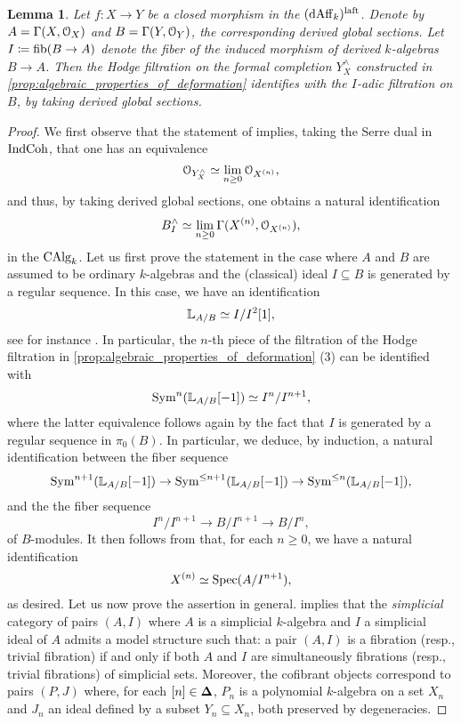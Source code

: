\documentclass[10pt,a4paper,reqno]{amsart} %
\theoremstyle{plain}
\newtheorem{lem}[thm]{Lemma}
\theoremstyle{definition}
\theoremstyle{remark}
\numberwithin{equation}{section}
\begin{document}
\begin{lem} \label{lem:identification_of_Hodge_and_adic_filtrations}
    Let $f \colon X \to Y$ be a closed morphism in the \infcat $(\mathrm{dAff}_k)^{\mathrm{laft}}$. Denote by $A = \Gamma(X, \mathcal O_X)$ and $B = \Gamma(Y, \mathcal O_Y)$, the corresponding derived
    global sections. Let $I \coloneqq \mathrm{fib}(B \to A)$ denote the fiber of the induced morphism of derived $k$-algebras $B \to A$. Then the Hodge filtration on the formal completion $Y^\wedge_X$ constructed in
    \cref{prop:algebraic_properties_of_deformation} identifies with the $I$-adic filtration on $B$, by taking derived global sections.
\end{lem}

\begin{proof}
    We first observe that the statement of \cite[Corollary 9.5.2.5]{Gaitsgory_Study_II} implies, taking the Serre dual in $\mathrm{Ind}\mathrm{Coh}$, that one has an equivalence
        \[
            \mathcal O_{Y^\wedge_X} \simeq \lim_{n \ge 0} \mathcal O_{X^{(n)}},  
        \]
    and thus, by taking derived global sections, one obtains a natural identification   
        \[
            B^\wedge_I \simeq \lim_{n \ge 0} \Gamma(X^{(n)}, \mathcal O_{X^{(n)}}),  
        \]
    in the \infcat $\mathrm{CAlg}_k$. Let us first prove the statement in the case where $A$ and $B$ are assumed to be ordinary $k$-algebras and the (classical) ideal $I \subseteq B$ is generated by a regular sequence.
    In this case, we have an identification
        \[
            \mathbb L_{A/ B} \simeq I/ I^2 [1],
        \]
    see for instance \cite[\href{https://stacks.math.columbia.edu/tag/08SJ}{Tag 08SJ}]{stacks-project}.
    In particular, the $n$-th piece of the filtration of the Hodge filtration in \cref{prop:algebraic_properties_of_deformation} (3) can be identified with
        \[
            \operatorname{Sym}^n(\mathbb L_{A/ B}[-1]) \simeq I^n/ I^{n+1}, 
        \]
    where the latter equivalence follows again by the fact that $I$ is generated by a regular sequence in $\pi_0(B)$. In particular, we deduce, by induction, a natural identification between
    the fiber sequence
        \[
            \operatorname{Sym}^{n+1}(\mathbb L_{A/ B}[-1]) \to \operatorname{Sym}^{\le n+1}(\mathbb L_{A/ B}[-1]) \to \operatorname{Sym}^{\le n}(\mathbb L_{A/ B}[-1]),
        \]
    and the the fiber sequence
        \[  
            I^n/ I^{n+1} \to B/ I^{n+1} \to B/ I^n,
        \]
    of $B$-modules. It then follows from \cite[Theorem 9.5.1.3]{Gaitsgory_Study_II} that, for each $n \ge 0$, we have a natural identification
        \[
            X^{(n)} \simeq \operatorname{Spec} (A/ I^{n+1}) ,
        \]
     as desired. Let us now prove the assertion in general. \cite[\S II. 4, Theorem 4]{Quillen_Homotopical_1967} implies that the \emph{simplicial} category of pairs
     $(A, I)$ where $A$ is a simplicial $k$-algebra and $I$ a simplicial ideal of $A$ admits a model structure such that:
     a pair $(A, I)$ is a fibration (resp., trivial fibration) if and only if both $A$ and $I$ are simultaneously fibrations (resp., trivial fibrations)
     of simplicial sets. Moreover, the cofibrant objects correspond to pairs $(P, J)$ where, for each $[n] \in \bm{\Delta}$, $P_n$ is a polynomial $k$-algebra on a set $X_n$
     and $J_n$ an ideal defined by a subset $Y_n \subseteq X_n$, both preserved by degeneracies. 
     

\end{proof}
\end{document}
